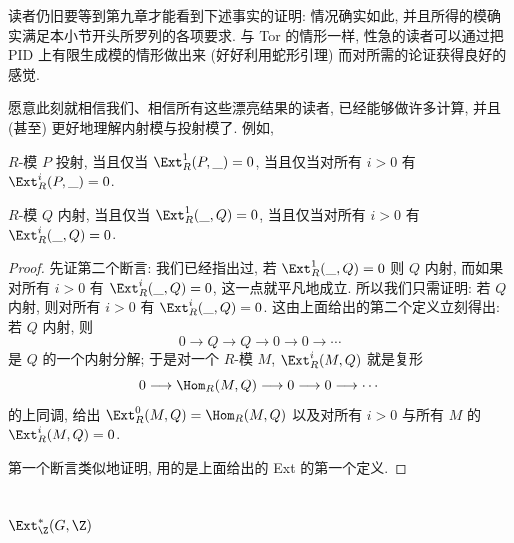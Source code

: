 读者仍旧要等到第九章才能看到下述事实的证明: 情况确实如此, 并且所得的模确实满足本小节开头所罗列的各项要求. 与 Tor 的情形一样, 性急的读者可以通过把 PID 上有限生成模的情形做出来 (好好利用蛇形引理) 而对所需的论证获得良好的感觉.

愿意此刻就相信我们、相信所有这些漂亮结果的读者, 已经能够做许多计算, 并且 (甚至) 更好地理解内射模与投射模了. 例如,

\begin{proposition}\label{prop:ext-projective-injective}
$R$-模 $P$ 投射, 当且仅当 $\Ext_R^1(P,\_)=0$, 当且仅当对所有 $i>0$ 有 $\Ext_R^i(P,\_)=0$.

$R$-模 $Q$ 内射, 当且仅当 $\Ext_R^1(\_,Q)=0$, 当且仅当对所有 $i>0$ 有 $\Ext_R^i(\_,Q)=0$.
\end{proposition}

\begin{proof}
先证第二个断言: 我们已经指出过, 若 $\Ext_R^1(\_,Q)=0$ 则 $Q$ 内射, 而如果对所有 $i>0$ 有 $\Ext_R^i(\_,Q)=0$, 这一点就平凡地成立. 所以我们只需证明: 若 $Q$ 内射, 则对所有 $i>0$ 有 $\Ext_R^i(\_,Q)=0$. 这由上面给出的第二个定义立刻得出: 若 $Q$ 内射, 则
\[
0\longrightarrow Q\longrightarrow Q\longrightarrow 0\longrightarrow 0\longrightarrow\cdots
\]
是 $Q$ 的一个内射分解; 于是对一个 $R$-模 $M$, $\Ext_R^i(M,Q)$ 就是复形
\[
0\longrightarrow\Hom_R(M,Q)\longrightarrow 0\longrightarrow 0\longrightarrow\cdots
\]
的上同调, 给出 $\Ext_R^0(M,Q)=\Hom_R(M,Q)$ 以及对所有 $i>0$ 与所有 $M$ 的 $\Ext_R^i(M,Q)=0$.

第一个断言类似地证明, 用的是上面给出的 Ext 的第一个定义.
\end{proof}

\subsection{\texorpdfstring{$\Ext^*_\Z(G,\Z)$}{Ext*Z(G,Z)}}\label{subsec:ext-g-z}

